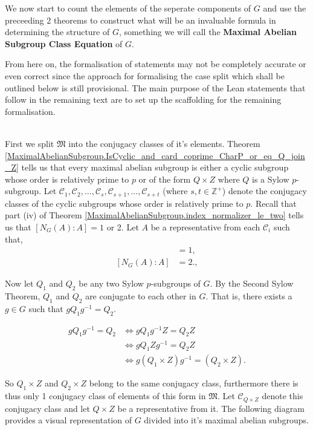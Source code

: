 We now start to count the elements of the seperate components of $G$ and use the preceeding 2 theorems to construct what will be an invaluable formula in determining the structure of $G$, something we will call the \textbf{Maximal Abelian Subgroup Class Equation} of $G$. \\

\begin{remark}
  From here on, the formalisation of statements may not be completely accurate or even correct since the approach for formalising the case split
  which shall be outlined below is still provisional. The main purpose of the Lean statements that follow in the remaining text are to set up the scaffolding for
  the remaining formalisation.
\end{remark}
\\
First we split $\mathfrak{M}$ into the conjugacy classes of it's elements. Theorem \ref{MaximalAbelianSubgroup.IsCyclic_and_card_coprime_CharP_or_eq_Q_join_Z} tells us that every maximal abelian subgroup is either a cyclic subgroup whose order is relatively prime to $p$ or of the form $Q \times Z$ where $Q$ is a Sylow $p$-subgroup. Let $\mathcal{C}_1, \mathcal{C}_2,...,\mathcal{C}_s, \mathcal{C}_{s+1},..., \mathcal{C}_{s+t}$ (where $s, t \in \mathbb{Z}^+$) denote the conjugacy classes of the cyclic subgroups whose order is relatively prime to $p$. Recall that part (iv) of Theorem \ref{MaximalAbelianSubgroup.index_normalizer_le_two} tells us that $[N_G(A): A] = 1$ or 2. Let $A$ be a representative from each $\mathcal{C}_i$ such that,
\begin{align*} [N_G(A) : A] &= 1, \tag{for  $i \leq s$} \\[2mm]
[N_G(A) : A] &= 2. \tag{for  $s < i \leq s+t$}, \end{align*}

Now let $Q_1$ and $Q_2$ be any two Sylow $p$-subgroups of $G$. By the Second Sylow Theorem, $Q_1$ and $Q_2$ are conjugate to each other in $G$. That is, there exists a $g \in G$ such that $gQ_1g^{-1} = Q_2$.

\begin{align*} gQ_1g^{-1} = Q_2 &\iff gQ_1g^{-1}Z = Q_2Z 
\\ &\iff gQ_1Zg^{-1} = Q_2Z
\\ &\iff g(Q_1 \times Z)g^{-1} = (Q_2 \times Z). %
\end{align*} 

So $Q_1 \times Z$ and $Q_2 \times Z$ belong to the same conjugacy class, furthermore there is thus only 1 conjugacy class of elements of this form in $\mathfrak{M}$. Let $\mathcal{C}_{Q \times Z}$ denote this conjugacy class and let $Q \times Z$ be a representative from it. The following diagram provides a visual representation of $G$ divided into it's maximal abelian subgroups.

